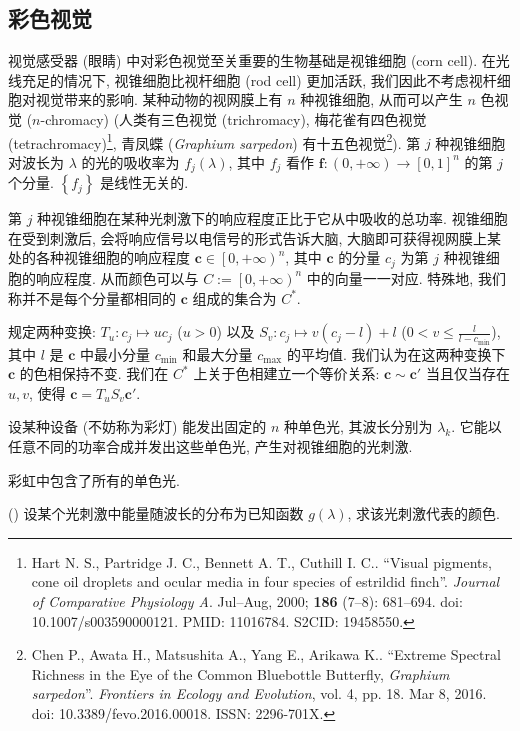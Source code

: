 \documentclass{article}
\newcounter{para}
\newcommand\mypara{\par\refstepcounter{para}(\thepara)\space}
\begin{document}
\subsection{彩色视觉}

视觉感受器 (眼睛) 中对彩色视觉至关重要的生物基础是视锥细胞 (corn cell).
在光线充足的情况下, 视锥细胞比视杆细胞 (rod cell) 更加活跃,
我们因此不考虑视杆细胞对视觉带来的影响.
某种动物的视网膜上有 $n$ 种视锥细胞, 从而可以产生 $n$ 色视觉 ($n$-chromacy)
(人类有三色视觉 (trichromacy),
梅花雀有四色视觉 (tetrachromacy)\footnote{
	Hart N. S., Partridge J. C., Bennett A. T., Cuthill I. C.\@.
	``Visual pigments, cone oil droplets and ocular media in four species of estrildid finch''.
	\textit{Journal of Comparative Physiology A}.
	Jul--Aug, 2000; \textbf{186} (7--8): 681--694.
	doi: 10.1007/s003590000121. PMID: 11016784. S2CID: 19458550.
},
青凤蝶 (\textit{Graphium sarpedon}) 有十五色视觉\footnote{
	Chen P., Awata H., Matsushita A., Yang E., Arikawa K.\@.
	``Extreme Spectral Richness in the Eye of the Common Bluebottle Butterfly, \textit{Graphium sarpedon}''.
	\textit{Frontiers in Ecology and Evolution}, vol. 4, pp. 18. Mar 8, 2016.
	doi: 10.3389/fevo.2016.00018. ISSN: 2296-701X.
}).
第 $j$ 种视锥细胞对波长为 $\lambda$ 的光的吸收率为 $f_j\!\left(\lambda\right)$,
其中 $f_j$ 看作 $\mathbf f:\left(0,+\infty\right)\to\left[0,1\right]^n$ 的第 $j$ 个分量.
$\left\{f_j\right\}$ 是线性无关的.

第 $j$ 种视锥细胞在某种光刺激下的响应程度正比于它从中吸收的总功率.
视锥细胞在受到刺激后, 会将响应信号以电信号的形式告诉大脑,
大脑即可获得视网膜上某处的各种视锥细胞的响应程度 $\mathbf c\in\left[0,+\infty\right)^n$,
其中 $\mathbf c$ 的分量 $c_j$ 为第 $j$ 种视锥细胞的响应程度.
从而颜色可以与 $C:=\left[0,+\infty\right)^n$ 中的向量一一对应.
特殊地, 我们称并不是每个分量都相同的 $\mathbf c$ 组成的集合为 $C^*$.

规定两种变换: $T_u:c_j\mapsto uc_j$ ($u>0$)
以及 $S_v:c_j\mapsto v\left(c_j-l\right)+l$ ($0<v\le\frac l{l-c_{\min}}$),
其中 $l$ 是 $\mathbf c$ 中最小分量 $c_{\min}$ 和最大分量 $c_{\max}$ 的平均值.
我们认为在这两种变换下 $\mathbf c$ 的色相保持不变.
我们在 $C^*$ 上关于色相建立一个等价关系: $\mathbf c\sim\mathbf c'$
当且仅当存在 $u,v$, 使得 $\mathbf c=T_uS_v\mathbf c'$.

设某种设备 (不妨称为彩灯) 能发出固定的 $n$ 种单色光, 其波长分别为 $\lambda_k$.
它能以任意不同的功率合成并发出这些单色光, 产生对视锥细胞的光刺激.

彩虹中包含了所有的单色光.

\mypara
设某个光刺激中能量随波长的分布为已知函数 $g\!\left(\lambda\right)$,
求该光刺激代表的颜色.
\end{document}
